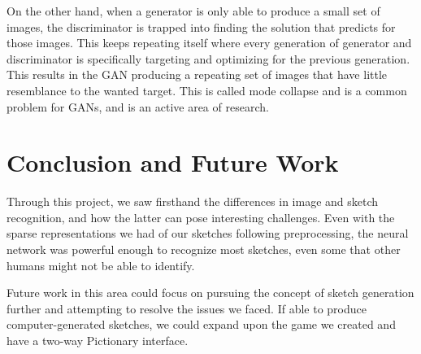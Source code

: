 \documentclass[10pt,twocolumn,letterpaper]{article}
\begin{document}
On the other hand, when a generator is only able to produce a small set of images, the discriminator is trapped into finding the solution that predicts for those images. This keeps repeating itself where every generation of generator and discriminator is specifically targeting and optimizing for the previous generation. This results in the GAN producing a repeating set of images that have little resemblance to the wanted target. This is called mode collapse and is a common problem for GANs, and is an active area of research.

\section{Conclusion and Future Work}

Through this project, we saw firsthand the differences in image and sketch recognition, and how the latter can pose interesting challenges. Even with the sparse representations we had of our sketches following preprocessing, the neural network was powerful enough to recognize most sketches, even some that other humans might not be able to identify.

Future work in this area could focus on pursuing the concept of sketch generation further and attempting to resolve the issues we faced. If able to produce computer-generated sketches, we could expand upon the game we created and have a two-way Pictionary interface.

{\small
  
  
}
\end{document}
